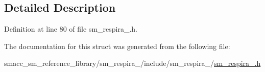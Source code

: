 \subsection{Detailed Description}


Definition at line 80 of file sm\+\_\+respira\+\_.\+h.



The documentation for this struct was generated from the following file\+:\begin{DoxyCompactItemize}
\item 
smacc\+\_\+sm\+\_\+reference\+\_\+library/sm\+\_\+respira\+\_/include/sm\+\_\+respira\+\_/\hyperlink{sm__respira__1_8h}{sm\+\_\+respira\+\_.\+h}\end{DoxyCompactItemize}
